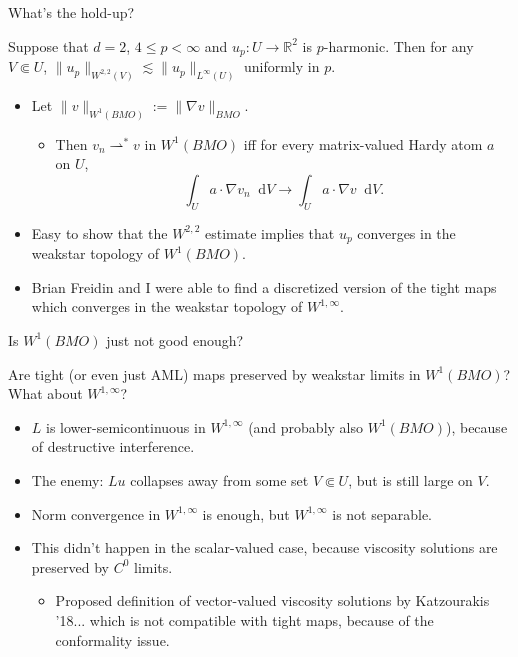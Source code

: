 \documentclass[10pt]{beamer}
\newcommand{\RR}{\mathbb{R}}
\newcommand*\dif{\mathop{}\!\mathrm{d}}
\begin{document}
\begin{frame}{What's the hold-up?}
\begin{theorem} 
Suppose that $d = 2$, $4 \leq p < \infty$ and $u_p: U \to \RR^2$ is $p$-harmonic.
Then for any $V \Subset U$, $\|u_p\|_{W^{2, 2}(V)} \lesssim \|u_p\|_{L^\infty(U)}$ uniformly in $p$.
\end{theorem}

\begin{itemize}
\item Let $\|v\|_{W^1(BMO)} := \|\nabla v\|_{BMO}$.
\begin{itemize}
\item Then $v_n \rightharpoonup^* v$ in $W^1(BMO)$ iff for every matrix-valued Hardy atom $a$ on $U$,
$$\int_U a \cdot \nabla v_n \dif V \to \int_U a \cdot \nabla v \dif V.$$
\end{itemize}
\item Easy to show that the $W^{2, 2}$ estimate implies that $u_p$ converges in the weakstar topology of $W^1(BMO)$.
\item Brian Freidin and I were able to find a discretized version of the tight maps which converges in the weakstar topology of $W^{1, \infty}$.
\end{itemize}

\end{frame}

\begin{frame}{Is $W^1(BMO)$ just not good enough?}
\begin{problem}
    Are tight (or even just AML) maps preserved by weakstar limits in $W^1(BMO)$? What about $W^{1, \infty}$?
\end{problem}

\begin{itemize}
\item $L$ is lower-semicontinuous in $W^{1, \infty}$ (and probably also $W^1(BMO)$), because of destructive interference.
\item The enemy: $Lu$ collapses away from some set $V \Subset U$, but is still large on $V$.
\item Norm convergence in $W^{1, \infty}$ is enough, but $W^{1, \infty}$ is not separable.
\item This didn't happen in the scalar-valued case, because viscosity solutions are preserved by $C^0$ limits.
\begin{itemize}
\item Proposed definition of vector-valued viscosity solutions by Katzourakis '18... which is not compatible with tight maps, because of the conformality issue.
\end{itemize}
\end{itemize}
\end{frame}
\end{document}
